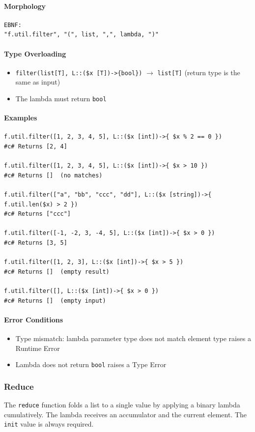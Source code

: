 \paragraph{Morphology}
\begin{verbatim}
EBNF:
"f.util.filter", "(", list, ",", lambda, ")"
\end{verbatim}

\paragraph{Type Overloading}
\begin{itemize}
\item \texttt{filter(list[T], L::(\$x [T])->\{bool\})} $\rightarrow$ \texttt{list[T]}
  (return type is the same as input)
\item The lambda must return \texttt{bool}
\end{itemize}

\paragraph{Examples}
\begin{verbatim}
f.util.filter([1, 2, 3, 4, 5], L::($x [int])->{ $x % 2 == 0 })
#c# Returns [2, 4]

f.util.filter([1, 2, 3, 4, 5], L::($x [int])->{ $x > 10 })
#c# Returns []  (no matches)

f.util.filter(["a", "bb", "ccc", "dd"], L::($x [string])->{ f.util.len($x) > 2 })
#c# Returns ["ccc"]

f.util.filter([-1, -2, 3, -4, 5], L::($x [int])->{ $x > 0 })
#c# Returns [3, 5]

f.util.filter([1, 2, 3], L::($x [int])->{ $x > 5 })
#c# Returns []  (empty result)

f.util.filter([], L::($x [int])->{ $x > 0 })
#c# Returns []  (empty input)
\end{verbatim}

\paragraph{Error Conditions}
\begin{itemize}
\item Type mismatch: lambda parameter type does not match element type raises a Runtime Error
\item Lambda does not return \texttt{bool} raises a Type Error
\end{itemize}

\subsubsection{Reduce}
The \texttt{reduce} function folds a list to a single value by applying a binary lambda cumulatively. The lambda receives an accumulator and the current element. The \texttt{init} value is always required.

